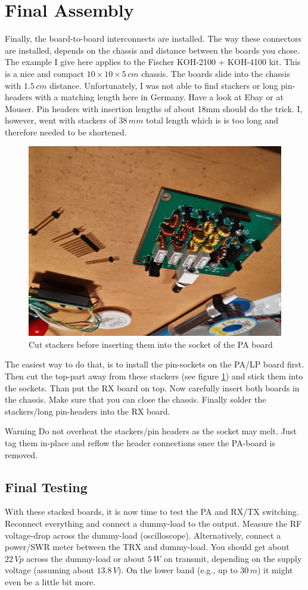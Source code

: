 \documentclass[10pt, a4paper,twoside,openright]{scrartcl}
\newenvironment{warning}{\begin{bclogo}[couleur=red!30,arrondi=.1,logo=\bcattention,ombre=true]{Warning}}{\end{bclogo}}
\begin{document}
\cleardoublepage
\section{Final Assembly} \label{sec:box}
Finally, the board-to-board interconnects are installed. The way these connectors are installed, depends on the chassis and distance between the boards you chose. The example I give here applies to the Fischer KOH-2100 + KOH-4100 kit. This is a nice and compact $10 \times 10 \times 5\,cm$ chassis. The boards slide into the chassis with $1.5\,cm$ distance. Unfortunately, I was not able to find stackers or long pin-headers with a matching length here in Germany. Have a look at Ebay or at Mouser. Pin headers with insertion lengths of about 18mm should do the trick. I, however, went with stackers of $38\,mm$ total length which is is too long and therefore needed to be shortened.

\begin{figure}[!ht]
 \centering
 \includegraphics[width=0.3\linewidth]{fig/stackers_small.png}
 \caption{Cut stackers before inserting them into the socket of the PA board} \label{fig:stackers}
\end{figure}

The easiest way to do that, is to install the pin-sockets on the PA/LP board first. Then cut the top-part away from these stackers (see figure \ref{fig:stackers}) and stick them into the sockets. Than put the RX board on top. Now carefully insert both boards in the chassis. Make sure that you can close the chassis. Finally solder the stackers/long pin-headers into the RX board. 

\begin{warning}
Do not overheat the stackers/pin headers as the socket may melt. Just tag them in-place and reflow the header connections once the PA-board is removed.
\end{warning}



\subsection{Final Testing}
With these stacked boards, it is now time to test the PA and RX/TX switching. Reconnect everything and connect a dummy-load to the output. Measure the RF voltage-drop across the dummy-load (oscilloscope). Alternatively, connect a power/SWR meter between the TRX and dummy-load. You should get about $22\,Vp$ across the dummy-load or about $5\,W$ on transmit, depending on the supply voltage (assuming about $13.8\,V$). On the lower band (e.g., up to $30\,m$) it might even be a little bit more. 
\end{document}
